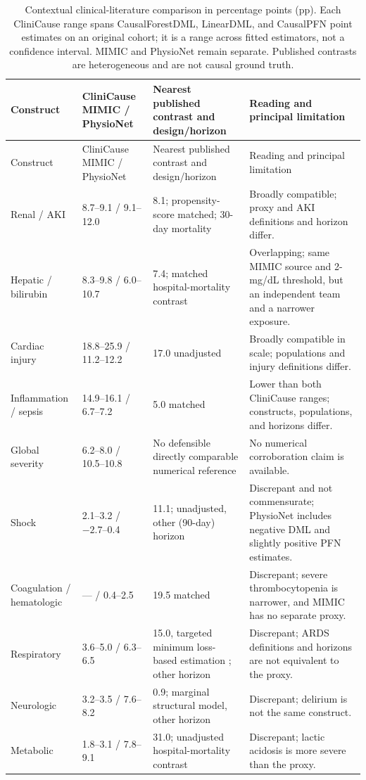 \begingroup
\scriptsize
\setlength{\tabcolsep}{3pt}
\begin{longtable}{@{}L{0.17\textwidth}L{0.19\textwidth}L{0.30\textwidth}L{0.25\textwidth}@{}}
\caption[Contextual clinical-literature comparison.]{Contextual clinical-literature comparison in percentage points (pp).  Each CliniCause range spans CausalForestDML, LinearDML, and CausalPFN point estimates on an original cohort; it is a range across fitted estimators, not a confidence interval.  MIMIC and PhysioNet remain separate.  Published contrasts are heterogeneous and are not causal ground truth.}
\label{tab:results-clinical-comparison}\\
\toprule
Construct & CliniCause MIMIC / PhysioNet & Nearest published contrast and design/horizon & Reading and principal limitation \\
\midrule
\endfirsthead
\toprule
Construct & CliniCause MIMIC / PhysioNet & Nearest published contrast and design/horizon & Reading and principal limitation \\
\midrule
\endhead
Renal / AKI & 8.7--9.1 / 9.1--12.0 & 8.1; propensity-score matched; 30-day mortality \cite{jiang2022akiattributable} & Broadly compatible; proxy and AKI definitions and horizon differ. \\
Hepatic / bilirubin & 8.3--9.8 / 6.0--10.7 & 7.4; matched hospital-mortality contrast \cite{yang2021bilirubinmortality} & Overlapping; same MIMIC source and 2-mg/dL threshold, but an independent team and a narrower exposure. \\
Cardiac injury & 18.8--25.9 / 11.2--12.2 & 17.0 unadjusted \cite{babuin2008troponin} & Broadly compatible in scale; populations and injury definitions differ. \\
Inflammation / sepsis & 14.9--16.1 / 6.7--7.2 & 5.0 matched \cite{shankarhari2018sepsis} & Lower than both CliniCause ranges; constructs, populations, and horizons differ. \\
Global severity & 6.2--8.0 / 10.5--10.8 & No defensible directly comparable numerical reference & No numerical corroboration claim is available. \\
Shock & 2.1--3.2 / $-2.7$--0.4 & 11.1; unadjusted, other (90-day) horizon \cite{lamontagne2020permissive} & Discrepant and not commensurate; PhysioNet includes negative DML and slightly positive PFN estimates. \\
Coagulation / hematologic & --- / 0.4--2.5 & 19.5 matched \cite{stephan1999thrombocytopenia} & Discrepant; severe thrombocytopenia is narrower, and MIMIC has no separate proxy. \\
Respiratory & 3.6--5.0 / 6.3--6.5 & 15.0, targeted minimum loss-based estimation \cite{torres2021ards}; other horizon & Discrepant; ARDS definitions and horizons are not equivalent to the proxy. \\
Neurologic & 3.2--3.5 / 7.6--8.2 & 0.9; marginal structural model, other horizon \cite{kleinklouwenberg2014delirium} & Discrepant; delirium is not the same construct. \\
Metabolic & 1.8--3.1 / 7.8--9.1 & 31.0; unadjusted hospital-mortality contrast \cite{gunnerson2006acidosis} & Discrepant; lactic acidosis is more severe than the proxy. \\
\bottomrule
\end{longtable}
